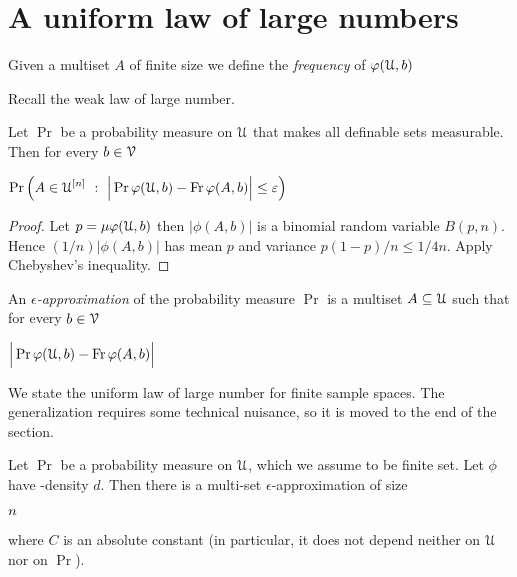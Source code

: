 \documentclass[sputnik.tex]{subfiles}
\begin{document}
\section{A uniform law of large numbers}

Given a multiset $A$ of finite size we define the \emph{frequency\/} of $\varphi(\EuScript U,b)$ 


Recall the weak law of large number.

\begin{proposition} 
Let $\Pr$ be a probability measure on $\EuScript U$ that makes all definable sets measurable. Then for every $b\in\EuScript V$

\def\ceq#1#2#3{\parbox[t]{45ex}{$\displaystyle #1$}\medrel{#2}{$\displaystyle #3$}}

\ceq{\hfill\displaystyle\Pr \Big(A\in\U^{[n]}\ :\ \Big|\Pr\phi(\U,b) - \Fr\phi(A,b)\Big|\le\epsilon\Big)}{\ge}{1-\frac{1}{4n\epsilon^2}}
\end{proposition}

\begin{proof}
Let $p=\mu\varphi(\EuScript U,b)$ then $\big|\phi(A,b)\big|$ is a binomial random variable $B(p,n)$. Hence $(1/n)\big|\phi(A,b)\big|$ has mean $p$ and variance $p(1-p)/n\le 1/4n$. Apply Chebyshev's inequality. 
\end{proof}


An \emph{$\epsilon$-approximation\/} of the probability measure $\Pr$ is a multiset $A\subseteq\EuScript U$ such that for every $b\in\EuScript V$

\def\ceq#1#2#3{\parbox[t]{30ex}{$\displaystyle #1$}\medrel{#2}{$\displaystyle #3$}}

\ceq{\hfill\displaystyle \Big|\Pr\phi(\U,b) - \Fr\phi(A,b)\Big|}{\le}{\epsilon}

We state the uniform law of large number for finite sample spaces. The generalization requires some technical nuisance, so it is moved to the end of the section.


\begin{proposition} 
Let $\Pr$ be a probability measure on $\EuScript U$, which we assume to be finite set. Let $\phi$ have \vc-density $d$. Then there is a multi-set $\epsilon$-approximation of size 

\ceq{\hfill n}{\le}{C\frac{d}{\epsilon^2}\ln\frac1\epsilon,}

where $C$ is an absolute constant (in particular, it does not depend neither on $\EuScript U$ nor on $\Pr$).
\end{proposition}
\end{document}

